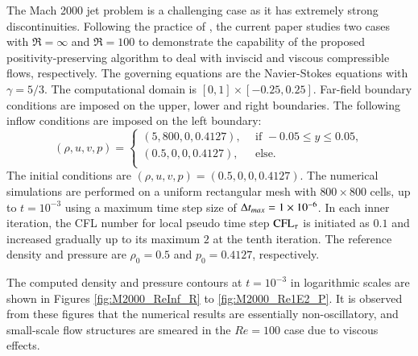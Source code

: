 The Mach 2000 jet problem \cite{zhang2010positivity} is a challenging case as it has extremely strong discontinuities.
Following the practice of \cite{huang2024general},
the current paper studies two cases with $\Re=\infty$ and $\Re=100$ to demonstrate the capability of the proposed positivity-preserving algorithm to deal with inviscid and viscous compressible flows, respectively.
{The governing equations are the Navier-Stokes equations with $\gamma=5/3$.}
The computational domain is $[0,1]\times[-0.25,0.25]$.
Far-field boundary conditions are imposed on the upper, lower and right boundaries. The following inflow conditions are imposed on the left boundary:
\begin{equation}
    (\rho,u,v,p) = \left\{
    \begin{array}{ll}
        (5,800,0,0.4127),\ \  & \text{if } -0.05 \leq y \leq 0.05, \\
        (0.5,0,0,0.4127),\ \  & \text{else}.                       \\
    \end{array}
    \right.
\end{equation}
The initial conditions are $(\rho,u,v,p)=(0.5,0,0,0.4127)$.
The numerical simulations are performed on a uniform rectangular mesh with $800 \times 800$ cells, up to $t=10^{-3}$ using a maximum time step size of $\mathrm\Delta t_{max} = 1\times10^{-6}$.
In each inner iteration, the CFL number for local pseudo time step $\text{CFL}_\tau$ is initiated as $0.1$
and increased gradually up to its maximum $2$ at the tenth iteration.
The reference density and pressure are
$\rho_0=0.5$ and $p_0=0.4127$, respectively.

The computed density and pressure contours at $t=10^{-3}$ in logarithmic scales are shown in Figures \ref{fig:M2000_ReInf_R} to \ref{fig:M2000_Re1E2_P}.
It is observed from these figures that the numerical results are essentially non-oscillatory, and small-scale flow structures are smeared in the $Re=100$ case due to viscous effects.

